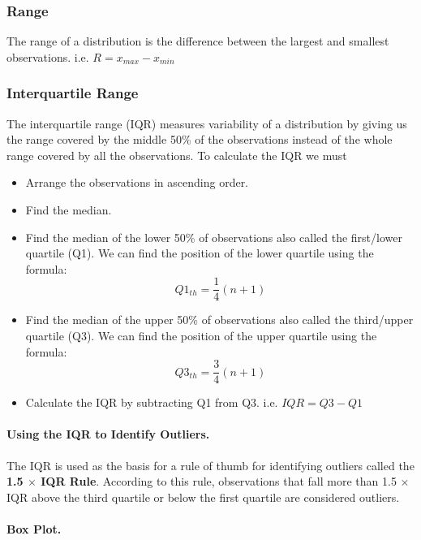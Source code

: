 \documentclass[12pt letter]{report}
\begin{document}
\subsubsection{Range}

The range of a distribution is the difference between the largest and smallest observations. i.e. $R = x_{max} - x_{min}$

\subsubsection{Interquartile Range}

The interquartile range (IQR) measures variability of a distribution by giving us the range covered by the middle 50\% of the
observations instead of the whole range covered by all the observations. To calculate the IQR we must

\begin{itemize}
	\item Arrange the observations in ascending order.
	\item Find the median.
	\item Find the median of the lower 50\% of observations also called the first/lower quartile (Q1). We can find the
	      position of the lower quartile using the formula:
	      \[
		      Q1_{th} = \frac{1}{4}(n + 1)
	      \]
	\item Find the median of the upper 50\% of observations also called the third/upper quartile (Q3). We can find the
	      position of the upper quartile using the formula:
	      \[
		      Q3_{th} = \frac{3}{4}(n + 1)
	      \]
	\item Calculate the IQR by subtracting Q1 from Q3. i.e. $IQR = Q3 - Q1$
\end{itemize}


\paragraph{Using the IQR to Identify Outliers.}

The IQR is used as the basis for a rule of thumb for identifying outliers called the \textbf{1.5 $\times$ IQR Rule}. According to this rule, observations that fall more than 1.5 $\times$ IQR above the third quartile or below the first quartile are considered outliers.


\paragraph{Box Plot.}
\end{document}
